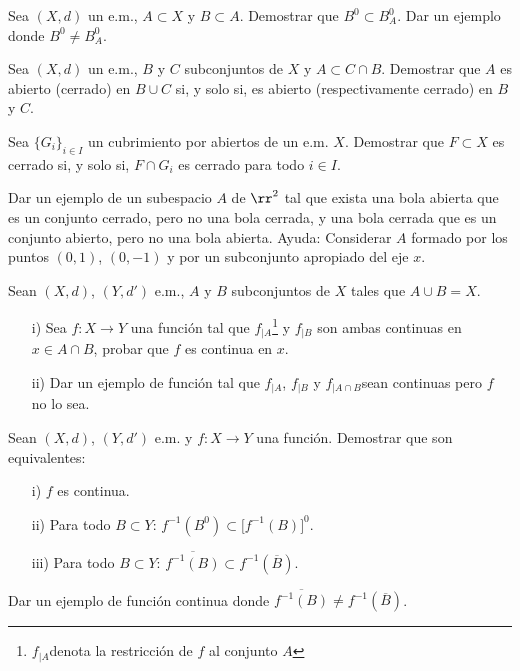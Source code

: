 \begin{ejercicio} Sea $(X,d)$ un e.m., $A\subset X$ y $B\subset
A$.  Demostrar que $B^0\subset B^0_A$. Dar un ejemplo donde
$B^0\neq B^0_A$.
\end{ejercicio}

\begin{ejercicio} Sea $(X,d)$ un e.m., $B$ y $C$ subconjuntos de
$X$ y $A\subset C\cap B$. Demostrar que $A$ es abierto (cerrado)
en $B\cup C$ si, y solo si, es abierto (respectivamente cerrado)
en $B$ y $C$.
\end{ejercicio}

\begin{ejercicio} Sea $\{G_i\}_{i\in I}$ un cubrimiento por abiertos de un e.m.
$X$. Demostrar que $F\subset X$ es cerrado si, y solo si, $F\cap
G_i$ es cerrado para todo $i\in I$.
\end{ejercicio}

\begin{ejercicio} Dar un ejemplo de un subespacio $A$ de $\rr^2$
tal que exista una bola abierta que es un conjunto cerrado, pero
no una bola cerrada, y una bola cerrada que es un conjunto
abierto, pero no una bola abierta. Ayuda: Considerar $A$ formado
por los puntos $(0,1)$, $(0,-1)$ y por un subconjunto apropiado
del eje $x$.
\end{ejercicio}


\begin{ejercicio} Sean $(X,d)$, $(Y,d')$ e.m., $A$ y $B$
subconjuntos de $X$ tales que $A\cup B=X$.
\begin{itemize}
\item[i)] Sea $f:X\rightarrow Y$ una funci\'on tal que
$f_{|A}$\footnote{$f_{|A}$denota la restricci\'on de $f$ al
conjunto $A$} y $f_{|B}$ son ambas continuas en $x\in A\cap B$,
probar que $f$ es continua en $x$.
\item[ii)] Dar un ejemplo de funci\'on tal que $f_{|A}$, $f_{|B}$ y $f_{|A\cap
B}$sean continuas pero $f$ no lo sea.
\end{itemize}
\end{ejercicio}

\begin{ejercicio} Sean $(X,d)$, $(Y,d')$ e.m. y $f:X\rightarrow Y$
una funci\'on. Demostrar que son equivalentes:
\begin{itemize}
\item[i)] $f$ es continua.
\item[ii)] Para todo $B\subset Y$: $f^{-1}(B^0)\subset
\bigl[f^{-1}(B)\bigr]^0$.
\item[iii)]Para todo $B\subset Y$: $\overline{f^{-1}(B)}\subset
f^{-1}(\overline{B})$.
\end{itemize}
Dar un ejemplo de funci\'on continua donde
$\overline{f^{-1}(B)}\neq f^{-1}(\overline{B})$.
\end{ejercicio}

